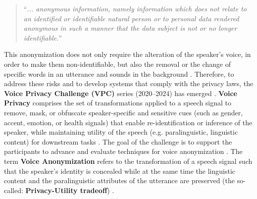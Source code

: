 \documentclass[12pt,leqno,a4paper]{article}
\begin{document}
\begin{quote}
``\textit{... anonymous information, namely information which does not relate to an identified or identifiable natural person or to personal data rendered anonymous in such a manner that the data subject is not or no longer identifiable.}'' \citep{noauthor_recital_nodate}
\end{quote}

This anonymization does not only require the alteration of the speaker's voice, in order to make them non-identifiable, 
but also the removal or the change of specific words in an utterance and sounds in the background \citep{tomashenko_voiceprivacy_2022-1}. 
Therefore, to address these risks and to develop systems that comply with the privacy laws, the \textbf{Voice Privacy Challenge (VPC)} series (2020–2024) has emerged \citep{tomashenko_voiceprivacy_2022-1, tomashenko_voiceprivacy_nodate, tomashenko2024voiceprivacy2024challengeevaluation}. 
\textbf{Voice Privacy} comprises the set of transformations applied to a speech signal to remove, mask, or obfuscate speaker-specific and sensitive 
cues (such as gender, accent, emotion, or health signals) that enable re-identification or inference of the speaker, while maintaining utility of 
the speech (e.g. paralinguistic, linguistic content) for downstream tasks \citep{champion_anonymizing_2024}. The goal of the challenge is to support the participants to advance and evaluate techniques for voice anonymization \citep{tomashenko_voiceprivacy_2022-1, VoicePrivacy2024}. 
The term \textbf{Voice Anonymization} refers to the transformation of a speech signal such that the speaker's identity is concealed while at the 
same time the linguistic content and the paralinguistic attributes of the utterance are preserved (the so-called: \textbf{Privacy-Utility tradeoff}) \citep{tomashenko2024voiceprivacy2024challengeevaluation}. 
\end{document}
